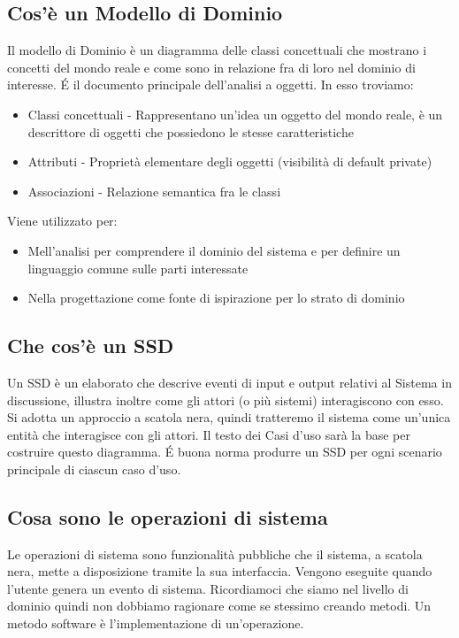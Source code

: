 \documentclass[12pt, a4paper, openany]{book}
\begin{document}
\subsection*{Cos'è un Modello di Dominio}
Il modello di Dominio è un diagramma delle classi concettuali che mostrano i concetti
del mondo reale e come sono in relazione fra di loro nel dominio di interesse. \'E il documento
principale dell'analisi a oggetti. In esso troviamo:
\begin{itemize}
    \item Classi concettuali - Rappresentano un'idea un oggetto del mondo reale, è un descrittore di
    oggetti che possiedono le stesse caratteristiche
    \item Attributi - Proprietà elementare degli oggetti (visibilità di default private)
    \item Associazioni - Relazione semantica fra le classi
\end{itemize}
Viene utilizzato per:
\begin{itemize}
    \item Mell'analisi per comprendere il dominio del sistema e per definire un linguaggio
    comune sulle parti interessate
    \item Nella progettazione come fonte di ispirazione per lo strato di dominio
\end{itemize}

\subsection*{Che cos'è un SSD}
Un SSD è un elaborato che descrive eventi di input e output relativi al Sistema
in discussione, illustra inoltre come gli attori (o più sistemi) interagiscono con esso.\\
Si adotta un approccio a scatola nera, quindi tratteremo il sistema come un'unica entità che 
interagisce con gli attori. Il testo dei Casi d'uso sarà la base per costruire questo
diagramma. \'E buona norma produrre un SSD per ogni scenario principale di ciascun caso d'uso.

\subsection*{Cosa sono le operazioni di sistema}
Le operazioni di sistema sono funzionalità pubbliche che il sistema, a scatola nera, 
mette a disposizione tramite la sua interfaccia. Vengono eseguite quando l'utente genera
un evento di sistema. Ricordiamoci che siamo nel livello di dominio
quindi non dobbiamo ragionare come se stessimo creando metodi. Un metodo software è l'implementazione di un'operazione.
\end{document}
